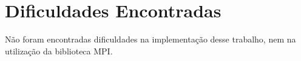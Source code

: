 \section{Dificuldades Encontradas}

Não foram encontradas diﬁculdades na implementação desse trabalho, nem na utilização da biblioteca MPI.